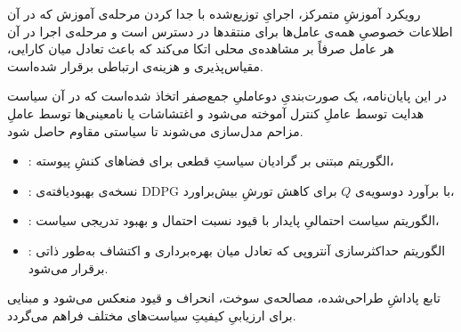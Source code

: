 %
%



رویکرد آموزشِ متمرکز، اجرایِ توزیع‌شده
با جدا کردن مرحله‌ی آموزش که در آن اطلاعات خصوصیِ همه‌ی عامل‌ها برای منتقدها در دسترس است و مرحله‌ی اجرا در آن هر عامل صرفاً بر مشاهده‌ی محلی اتکا می‌کند که باعث تعادل میان کارایی، مقیاس‌پذیری و هزینه‌ی ارتباطی برقرار شده‌است.

در این پایان‌نامه، یک صورت‌بندیِ دو‌عاملیِ جمع‌صفر اتخاذ شده‌است که در آن سیاست هدایت توسط {عاملِ کنترل} آموخته می‌شود و اغتشاشات یا نامعینی‌ها توسط {عاملِ مزاحم} مدل‌سازی می‌شوند تا سیاستی مقاوم حاصل شود.

\begin{itemize}
	\item {}: الگوریتم مبتنی بر گرادیان سیاستِ قطعی برای فضاهای کنشِ پیوسته،
	\item {}: نسخه‌ی بهبودیافته‌ی DDPG با برآورد دوسویه‌ی $Q$
	برای کاهش تورشِ بیش‌براورد،
	\item {}: الگوریتم سیاست احتمالیِ پایدار با قیود نسبت احتمال و بهبود تدریجی سیاست،
	\item {}: الگوریتم حداکثرسازی آنتروپی که تعادل میان بهره‌برداری و اکتشاف به‌طور ذاتی برقرار می‌شود.
\end{itemize}

تابع پاداشِ طراحی‌شده، مصالحه‌ی سوخت، انحراف و قیود منعکس می‌شود و مبنایی برای ارزیابیِ کیفیتِ سیاست‌های مختلف فراهم می‌گردد.
